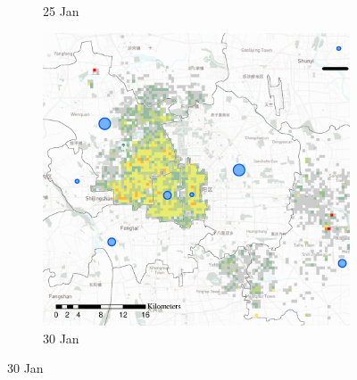 \documentclass[preprints,ijgi,submit,moreauthors]{Definitions/mdpi}
\begin{document}
\begin{figure}[ht]
\begin{subfigure}{.3\textwidth}
        \caption{25 Jan}
    \end{subfigure}
    \begin{subfigure}{.3\textwidth}
        \includegraphics[width=\textwidth]{Figures/Relation_with_confrimed_cases/NewDistrictSSBD2020_01_30.eps}
        \caption{30 Jan}
    \end{subfigure}


\end{figure}
\end{document}
